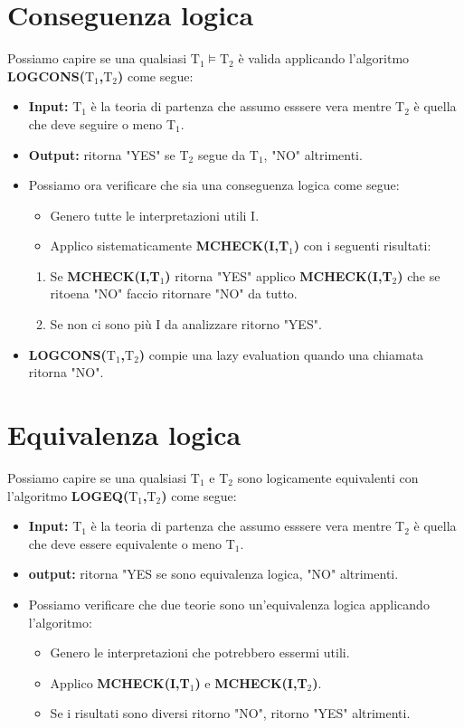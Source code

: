 \documentclass[../main.tex]{subfiles}
\begin{document}
    \section{Conseguenza logica}
    Possiamo capire se una qualsiasi $\text{T}_1 \models \text{T}_2$ è valida applicando l'algoritmo \textbf{LOGCONS($\text{T}_1$,$\text{T}_2$)} come segue:
    \begin{itemize}
        \item \textbf{Input:} T$_1$ è la teoria di partenza che assumo esssere vera mentre T$_2$ è quella che deve seguire o meno T$_1$.
        \item \textbf{Output:} ritorna "YES" se T$_2$ segue da T$_1$, "NO" altrimenti.
        \item Possiamo ora verificare che sia una conseguenza logica come segue:
        \begin{itemize}
            \item Genero tutte le interpretazioni utili I.
            \item Applico sistematicamente \textbf{MCHECK(I,T$_1$)} con i seguenti risultati:
        \end{itemize}
        \begin{enumerate}
            \item Se \textbf{MCHECK(I,T$_1$)} ritorna "YES" applico \textbf{MCHECK(I,T$_2$)} che se ritoena "NO" faccio ritornare "NO" da tutto.
            \item Se non ci sono più I da analizzare ritorno "YES".
        \end{enumerate}
    \item \textbf{LOGCONS($\text{T}_1$,$\text{T}_2$)} compie una lazy evaluation quando una chiamata ritorna "NO".
    \end{itemize}

    \section{Equivalenza logica}
    Possiamo capire se una qualsiasi $\text{T}_1$ e $\text{T}_2$ sono logicamente equivalenti con l'algoritmo \textbf{LOGEQ($\text{T}_1$,$\text{T}_2$)} come segue:
    \begin{itemize}
        \item \textbf{Input:} T$_1$ è la teoria di partenza che assumo esssere vera mentre T$_2$ è quella che deve essere equivalente o meno T$_1$.
        \item \textbf{output:} ritorna "YES se sono equivalenza logica, "NO" altrimenti.
        \item Possiamo verificare che due teorie sono un'equivalenza logica applicando l'algoritmo:
        \begin{itemize}
            \item Genero le interpretazioni che potrebbero essermi utili.
            \item Applico \textbf{MCHECK(I,T$_1$)} e  \textbf{MCHECK(I,T$_2$)}.
            \item Se i risultati sono diversi ritorno "NO", ritorno "YES" altrimenti.
        \end{itemize}
    \end{itemize}
\end{document}
